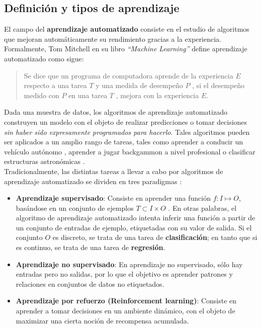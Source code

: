 \subsection{Definición y tipos de aprendizaje}

El campo del \textbf{aprendizaje automatizado} consiste en el estudio de algoritmos que mejoran automáticamente su rendimiento gracias a la experiencia. Formalmente, Tom Mitchell en su libro \textit{ ``Machine Learning''} \cite{mitchell} define aprendizaje automatizado como sigue:

\begin{quotation}
Se dice que un programa de computadora aprende de la experiencia $E$ respecto a una tarea $T$ y una medida de desempeño $P$ , si el desempeño medido con $P$ en una tarea $T$ , mejora con la experiencia $E$.
\end{quotation}

Dada una muestra de datos, los algoritmos de aprendizaje automatizado construyen un modelo con el objeto de realizar predicciones o tomar decisiones \textit{sin haber sido expresamente programados para hacerlo}. Tales algoritmos pueden ser aplicados a un amplio rango de tareas, tales como aprender a conducir un vehículo autónomo \cite{Pomerleau-1989-15721}, aprender a jugar backgammon a nivel profesional \cite{Tesauro1995} o clasificar estructuras astronómicas \cite{clasify_astronomy}.  \\

Tradicionalmente, las distintas tareas a llevar a cabo por algoritmos de aprendizaje automatizado se dividen en tres paradigmas \cite{ai}:

\begin{itemize}
\item \textbf{Aprendizaje supervisado}: Consiste en aprender una función $f : I \mapsto O$, basándose en un conjunto de ejemplos $T \subset I \times O$ . En otras palabras, el algoritmo de aprendizaje automatizado intenta inferir una función a partir de un conjunto de entradas de ejemplo, etiquetadas con su valor de salida. Si el conjunto $O$ es discreto, se trata de una tarea de \textbf{clasificación}; en tanto que si es continuo, se trata de una tarea de \textbf{regresión}.
\item \textbf{Aprendizaje no supervisado}: En aprendizaje no supervisado, sólo hay entradas pero no salidas, por lo que el objetivo es aprender patrones y relaciones en conjuntos de datos no etiquetados.

\item \textbf{Aprendizaje por refuerzo (Reinforcement learning)}: Consiste en aprender a tomar decisiones en un ambiente dinámico, con el objeto de maximizar una cierta noción de recompensa acumulada. 
\end{itemize}

